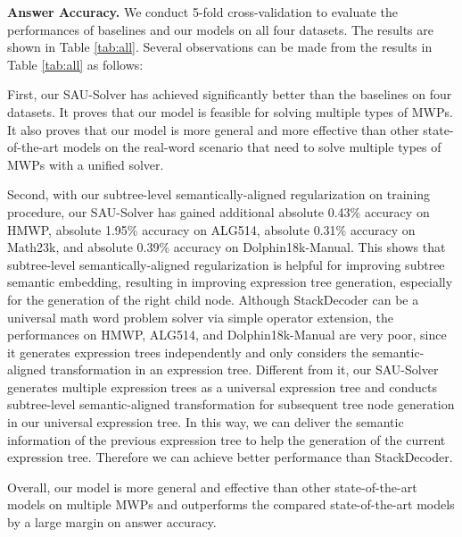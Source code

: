 \documentclass[11pt,a4paper]{article}
\begin{document}
\noindent\textbf{Answer Accuracy.} We conduct 5-fold cross-validation to evaluate the performances of baselines and our models on all four datasets. The results are shown in Table \ref{tab:all}. Several observations can be made from the results in Table \ref{tab:all} as follows: 

First, our SAU-Solver has achieved significantly better than the baselines on four datasets. It proves that our model is feasible for solving multiple types of MWPs. It also proves that our model is more general and more effective than other state-of-the-art models on the real-word scenario that need to solve multiple types of MWPs with a unified solver. 

Second, with our subtree-level semantically-aligned regularization on training procedure, our SAU-Solver has gained additional absolute 0.43\% accuracy on HMWP, absolute 1.95\% accuracy on ALG514, absolute 0.31\% accuracy on Math23k, and absolute 0.39\% accuracy on Dolphin18k-Manual. This shows that subtree-level semantically-aligned regularization is helpful for improving subtree semantic embedding, resulting in improving expression tree generation, especially for the generation of the right child node. Although StackDecoder can be a universal math word problem solver via simple operator extension, the performances on HMWP, ALG514, and Dolphin18k-Manual are very poor, since it generates expression trees independently and only considers the semantic-aligned transformation in an expression tree. Different from it, our SAU-Solver generates multiple expression trees as a universal expression tree and conducts subtree-level semantic-aligned transformation for subsequent tree node generation in our universal expression tree. In this way, we can deliver the semantic information of the previous expression tree to help the generation of the current expression tree. Therefore we can achieve better performance than StackDecoder. 

Overall, our model is more general and effective than other state-of-the-art models on multiple MWPs and outperforms the compared state-of-the-art models by a large margin on answer accuracy.
\end{document}
